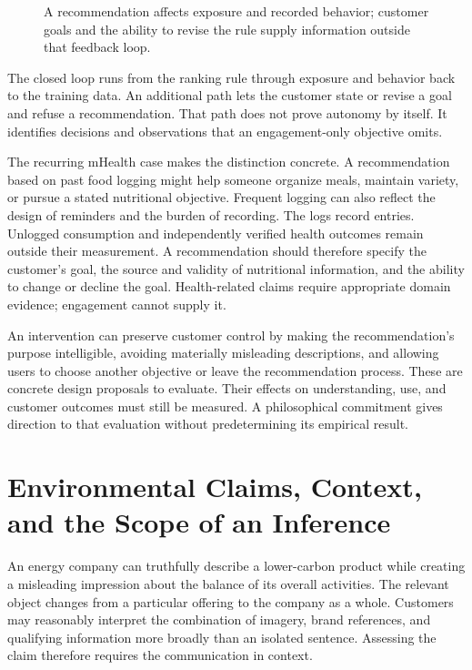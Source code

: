 \begin{figure}[htbp]
\centering

\caption{A recommendation affects exposure and recorded behavior; customer goals and the ability to revise the rule supply information outside that feedback loop.}\label{fig:M09_goal_revision}
\end{figure}

The closed loop runs from the ranking rule through exposure and behavior
back to the training data. An additional path lets the customer state or
revise a goal and refuse a recommendation. That path does not prove
autonomy by itself. It identifies decisions and observations that an
engagement-only objective omits.

The recurring mHealth case makes the distinction concrete. A
recommendation based on past food logging might help someone organize
meals, maintain variety, or pursue a stated nutritional objective.
Frequent logging can also reflect the design of reminders and the burden
of recording. The logs record entries. Unlogged consumption and
independently verified health outcomes remain outside their measurement.
A recommendation should therefore specify the customer's goal, the
source and validity of nutritional information, and the ability to
change or decline the goal. Health-related claims require appropriate
domain evidence; engagement cannot supply it.

An intervention can preserve customer control by making the
recommendation's purpose intelligible, avoiding materially misleading
descriptions, and allowing users to choose another objective or leave
the recommendation process. These are concrete design proposals to
evaluate. Their effects on understanding, use, and customer outcomes
must still be measured. A philosophical commitment gives direction to
that evaluation without predetermining its empirical result.


\hypertarget{M09-environmental-claims-context-and-the-scope-of-an-inference}{%
\section{Environmental Claims, Context, and the Scope of an
Inference}\label{M09-environmental-claims-context-and-the-scope-of-an-inference}}

\noindent \noindent An energy company can truthfully describe a lower-carbon
product while creating a misleading impression about the balance of its
overall activities. The relevant object changes from a particular
offering to the company as a whole. Customers may reasonably interpret
the combination of imagery, brand references, and qualifying information
more broadly than an isolated sentence. Assessing the claim therefore
requires the communication in context.

